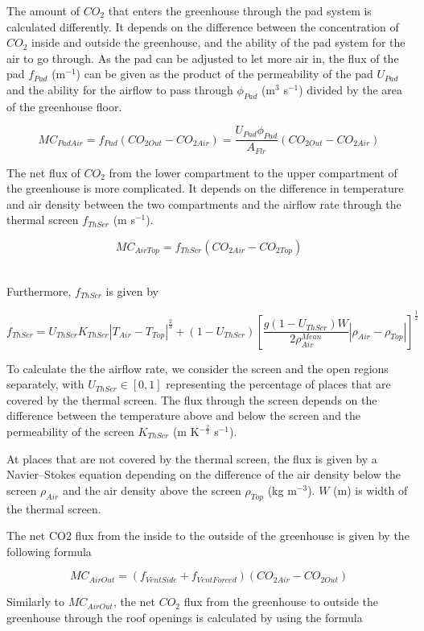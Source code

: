 \documentclass[a4paper]{article}
\begin{document}
The amount of $CO_2$ that enters the greenhouse through the pad system is calculated differently. It depends on the difference between the concentration of $CO_2$ inside and outside the greenhouse, and the ability of the pad system for the air to go through. As the pad can be adjusted to let more air in, the flux of the pad $f_{Pad}$ (m$^{-1}$) can be given as the product of the permeability of the pad $U_{Pad}$ and the ability for the airflow to pass through $\phi_{Pad}$ (m$^3$ s$^{-1}$) divided by the area of the greenhouse floor.

$$MC_{PadAir} = f_{Pad} (CO_{2 Out} - CO_{2 Air}) = \frac{U_{Pad} \phi_{Pad}}{A_{Flr}} (CO_{2 Out} - CO_{2 Air})$$

The net flux of $CO_2$ from the lower compartment to the upper compartment of the greenhouse is more complicated. It depends on the difference in temperature and air density between the two compartments and the airflow rate through the thermal screen $f_{ThScr}$ (m s$^{-1}$).

$$MC_{AirTop} = f_{ThScr} (CO_{2 Air} - CO_{2 Top})$$

\\
Furthermore, $f_{ThScr}$ is given by 

$$f_{ThScr} = U_{ThScr} K_{ThScr} |T_{Air} - T_{Top}| ^{\frac{2}{3}} + (1 - U_{ThScr}) [\frac{g(1 - U_{ThScr})W}{2\rho^{Mean}_{Air}} |\rho_{Air} - \rho_{Top}|]^{\frac{1}{2}}$$

To calculate the the airflow rate, we consider the screen and the open regions separately, with $U_{ThScr} \in [0,1]$ representing the percentage of places that are covered by the thermal screen. The flux through the screen depends on the difference between the temperature above and below the screen and the permeability of the screen $K_{ThScr}$ (m K$^{-\frac{2}{3}}$ s$^{-1}$). 

At places that are not covered by the thermal screen, the flux is given by a Navier–Stokes equation depending on the difference of the air density below the screen $\rho_{Air}$ and the air density above the screen $\rho_{Top}$ (kg m$^{−3}$). $W$ (m) is width of the thermal screen.

The net CO2 flux from the inside to the outside of the greenhouse is given by the following formula

$$MC_{AirOut} = (f_{VentSide} + f_{VentForced})(CO_{2 Air} - CO_{2 Out})$$


Similarly to $MC_{AirOut}$, the net $CO_2$ flux from the greenhouse to outside the greenhouse through the roof openings is calculated by using the formula
\end{document}
